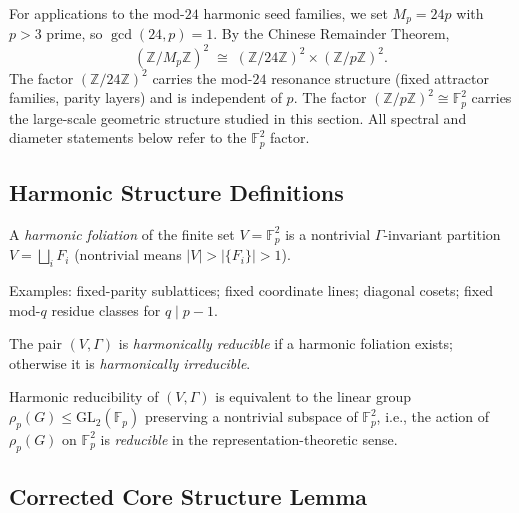 \begin{remark}
  \label{rem:prime_lift}
  For applications to the mod-$24$ harmonic seed families, we set $M_p = 24p$ with
  $p > 3$ prime, so $\gcd(24, p) = 1$.  By the Chinese Remainder Theorem,
  \[
    (\mathbb{Z}/M_p\mathbb{Z})^2 \;\cong\; (\mathbb{Z}/24\mathbb{Z})^2 \times (\mathbb{Z}/p\mathbb{Z})^2.
  \]
  The factor $(\mathbb{Z}/24\mathbb{Z})^2$ carries the mod-$24$ resonance structure (fixed
  attractor families, parity layers) and is independent of $p$.
  The factor $(\mathbb{Z}/p\mathbb{Z})^2 \cong \mathbb{F}_p^2$ carries the large-scale
  geometric structure studied in this section.  All spectral and diameter
  statements below refer to the $\mathbb{F}_p^2$ factor.
\end{remark}

\subsection{Harmonic Structure Definitions}
\label{sec:harmonic:foliation}

\begin{definition}
  \label{def:foliation}
  A \emph{harmonic foliation} of the finite set $V = \mathbb{F}_p^2$ is a
  nontrivial $\Gamma$-invariant partition
  $V = \bigsqcup_i F_i$ (nontrivial means $|V| > |\{F_i\}| > 1$).

  Examples: fixed-parity sublattices; fixed coordinate lines; diagonal cosets;
  fixed mod-$q$ residue classes for $q \mid p-1$.
\end{definition}

\begin{definition}
  \label{def:reducibility}
  The pair $(V, \Gamma)$ is \emph{harmonically reducible} if a harmonic foliation
  exists; otherwise it is \emph{harmonically irreducible}.
\end{definition}

\begin{remark}
  Harmonic reducibility of $(V, \Gamma)$ is equivalent to the linear group
  $\rho_p(G) \leq \mathrm{GL}_2(\mathbb{F}_p)$ preserving a nontrivial subspace of
  $\mathbb{F}_p^2$, i.e., the action of $\rho_p(G)$ on $\mathbb{F}_p^2$ is
  \emph{reducible} in the representation-theoretic sense.
\end{remark}

\subsection{Corrected Core Structure Lemma}
\label{sec:harmonic:core}

